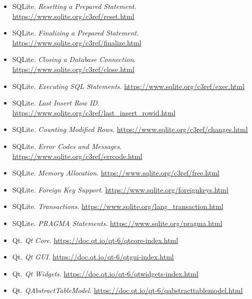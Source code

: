 \documentclass[10pt,a4paper]{article}
\begin{document}
\begin{itemize}
    \item SQLite. \textit{Resetting a Prepared Statement}.
    \url{https://www.sqlite.org/c3ref/reset.html}

    \item SQLite. \textit{Finalizing a Prepared Statement}.
    \url{https://www.sqlite.org/c3ref/finalize.html}

    \item SQLite. \textit{Closing a Database Connection}.
    \url{https://www.sqlite.org/c3ref/close.html}

    \item SQLite. \textit{Executing SQL Statements}.
    \url{https://www.sqlite.org/c3ref/exec.html}

    \item SQLite. \textit{Last Insert Row ID}.
    \url{https://www.sqlite.org/c3ref/last_insert_rowid.html}

    \item SQLite. \textit{Counting Modified Rows}.
    \url{https://www.sqlite.org/c3ref/changes.html}

    \item SQLite. \textit{Error Codes and Messages}.
    \url{https://www.sqlite.org/c3ref/errcode.html}

    \item SQLite. \textit{Memory Allocation}.
    \url{https://www.sqlite.org/c3ref/free.html}

    \item SQLite. \textit{Foreign Key Support}.
    \url{https://www.sqlite.org/foreignkeys.html}

    \item SQLite. \textit{Transactions}.
    \url{https://www.sqlite.org/lang_transaction.html}

    \item SQLite. \textit{PRAGMA Statements}.
    \url{https://www.sqlite.org/pragma.html}

    \item Qt. \textit{Qt Core}.
    \url{https://doc.qt.io/qt-6/qtcore-index.html}

    \item Qt. \textit{Qt GUI}.
    \url{https://doc.qt.io/qt-6/qtgui-index.html}

    \item Qt. \textit{Qt Widgets}.
    \url{https://doc.qt.io/qt-6/qtwidgets-index.html}

    \item Qt. \textit{QAbstractTableModel}.
    \url{https://doc.qt.io/qt-6/qabstracttablemodel.html}


\end{itemize}
\end{document}
